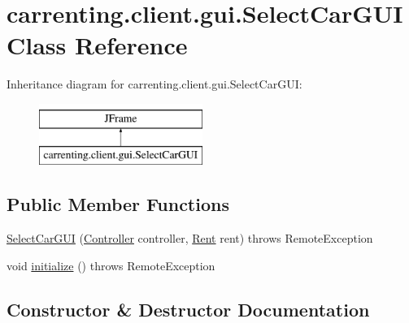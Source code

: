 \hypertarget{classcarrenting_1_1client_1_1gui_1_1_select_car_g_u_i}{}\section{carrenting.\+client.\+gui.\+Select\+Car\+G\+UI Class Reference}
\label{classcarrenting_1_1client_1_1gui_1_1_select_car_g_u_i}
Inheritance diagram for carrenting.\+client.\+gui.\+Select\+Car\+G\+UI\+:\begin{figure}[H]
\begin{center}
\leavevmode
\includegraphics[height=2.000000cm]{classcarrenting_1_1client_1_1gui_1_1_select_car_g_u_i}
\end{center}
\end{figure}
\subsection*{Public Member Functions}
\begin{DoxyCompactItemize}
\item 
\mbox{\hyperlink{classcarrenting_1_1client_1_1gui_1_1_select_car_g_u_i_a6cef20fdd6f6bf8eab97ba844abd2a91}{Select\+Car\+G\+UI}} (\mbox{\hyperlink{classcarrenting_1_1client_1_1_controller}{Controller}} controller, \mbox{\hyperlink{classcarrenting_1_1server_1_1jdo_1_1_rent}{Rent}} rent)  throws Remote\+Exception
\item 
void \mbox{\hyperlink{classcarrenting_1_1client_1_1gui_1_1_select_car_g_u_i_a6e81cefc1c5bb31c0b0c5c7e766bc468}{initialize}} ()  throws Remote\+Exception 
\end{DoxyCompactItemize}


\subsection{Constructor \& Destructor Documentation}
\mbox{\label{classcarrenting_1_1client_1_1gui_1_1_select_car_g_u_i_a6cef20fdd6f6bf8eab97ba844abd2a91}} 
